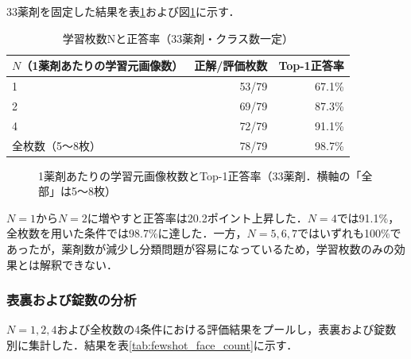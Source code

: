 \documentclass[dvipdfmx]{jsarticle}
\begin{document}
33薬剤を固定した結果を表\ref{tab:fewshot}および図\ref{fig:fewshot_curve}に示す．

\begin{table}[htbp]
\centering
\caption{学習枚数Nと正答率（33薬剤・クラス数一定）}
\label{tab:fewshot}
\begin{tabular}{lrr}
\hline
$N$（1薬剤あたりの学習元画像数） & 正解/評価枚数 & Top-1正答率 \\
\hline
1 & 53/79 & 67.1\% \\
2 & 69/79 & 87.3\% \\
4 & 72/79 & 91.1\% \\
全枚数（5〜8枚） & 78/79 & 98.7\% \\
\hline
\end{tabular}
\end{table}

\begin{figure}[htbp]
\centering
{}
\caption{1薬剤あたりの学習元画像枚数とTop-1正答率（33薬剤．横軸の「全部」は5〜8枚）}
\label{fig:fewshot_curve}
\end{figure}

$N=1$から$N=2$に増やすと正答率は20.2ポイント上昇した．$N=4$では91.1\%，全枚数を用いた条件では98.7\%に達した．一方，$N=5,6,7$ではいずれも100\%であったが，薬剤数が減少し分類問題が容易になっているため，学習枚数のみの効果とは解釈できない．

\subsubsection{表裏および錠数の分析}

$N=1,2,4$および全枚数の4条件における評価結果をプールし，表裏および錠数別に集計した．結果を表\ref{tab:fewshot_face_count}に示す．
\end{document}
